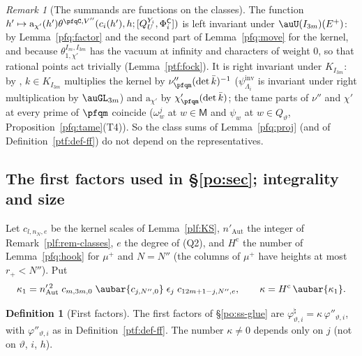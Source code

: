 \documentclass[10pt]{amsart}
\theoremstyle{definition}
\newtheorem{definition}[theorem]{Definition}
\theoremstyle{remark}
\newtheorem{remark}[theorem]{Remark}
\begin{document}
\begin{remark}[The summands are functions on the classes]\label{pfq:rem-classes}
The function $h'\mapsto\mathrm a_{\chi'}(h')\theta^{\pfqC,V''}(c_i(h'),h;[Q^{Y_i}_U,\Phi^{\mathsf C}_i])$ is left invariant under
$\auU(I_{3m})(E^+)$: by Lemma~\ref{pfq:factor} and the second part of Lemma~\ref{pfq:move} for the kernel, and because
$\theta^{I_m,I_{3m}}_{1,\chi'}$ has the vacuum at infinity and characters of weight $0$, so that rational points act trivially
(Lemma~\ref{ptf:fock}). It is right invariant under $K_{I_{3m}}$: by {\cite[Lemma~2.9]{P53}}, $k\in K_{I_{3m}}$ multiplies the kernel by
$\nu''_{\pfqm}(\det\bar k)^{-1}$ ($\psi^{\mathrm{inv}}_{\Lambda_i}$ is invariant under right multiplication by $\auGL_{3m}$) and
$\mathrm a_{\chi'}$ by $\chi'_{\pfqm}(\det\bar k)$; the tame parts of $\nu''$ and $\chi'$ at every prime of $\pfqm$ coincide
($\omega_w^j$ at $w\in\mathsf M$ and $\psi_w$ at $w\in Q_\vartheta$, Proposition~\ref{pfq:tame}(T4)). So the class sums of
Lemma~\ref{pfq:proj} (and of Definition~\ref{ptf:def-ff}) do not depend on the representatives.
\end{remark}

\subsection{The first factors used in \S\ref{po:sec}; integrality and size}\label{pfq:ss-ff}

Let $c_{l,n_N,e}$ be the kernel scales of Lemma~\ref{plf:KS}, $n'_{\mathrm{Aut}}$ the integer of Remark~\ref{plf:rem-classes},
$e$ the degree of (Q2), and $H^{\mathrm c}$ the number of Lemma~\ref{pfq:hook} for $\mu^+$ and $N=N''$ (the columns of
$\mu^+$ have heights at most $r_+<N''$). Put
\[
\kappa_1=n'^{\,2}_{\mathrm{Aut}}\;c_{m,3m,0}\;\aubar{c_{j,N'',0}}\;\epsilon_j\;c_{12m+1-j,N'',e},\qquad\kappa=H^{\mathrm c}\,\aubar{\kappa_1}.
\]

\begin{definition}[First factors]\label{pfq:def-ff}
The first factors of \S\ref{po:ss-glue} are $\varphi^\natural_{\vartheta,i}=\kappa\,\varphi''_{\vartheta,i}$, with $\varphi''_{\vartheta,i}$ as in
Definition~\ref{ptf:def-ff}. The number $\kappa\ne0$ depends only on $j$ (not on $\vartheta$, $i$, $h$).
\end{definition}
\end{document}

